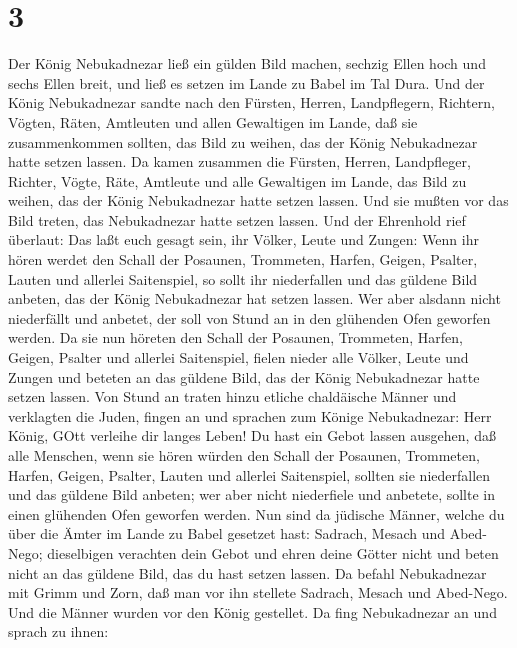 \hypertarget{section-2}{%
\section{3}\label{section-2}}

 Der König Nebukadnezar ließ ein gülden Bild machen, sechzig
Ellen hoch und sechs Ellen breit, und ließ es setzen im Lande zu Babel
im Tal Dura.  Und der König Nebukadnezar sandte nach den
Fürsten, Herren, Landpflegern, Richtern, Vögten, Räten, Amtleuten und
allen Gewaltigen im Lande, daß sie zusammenkommen sollten, das Bild zu
weihen, das der König Nebukadnezar hatte setzen lassen.  Da
kamen zusammen die Fürsten, Herren, Landpfleger, Richter, Vögte, Räte,
Amtleute und alle Gewaltigen im Lande, das Bild zu weihen, das der König
Nebukadnezar hatte setzen lassen. Und sie mußten vor das Bild treten,
das Nebukadnezar hatte setzen lassen.  Und der Ehrenhold
rief überlaut: Das laßt euch gesagt sein, ihr Völker, Leute und Zungen:
 Wenn ihr hören werdet den Schall der Posaunen, Trommeten,
Harfen, Geigen, Psalter, Lauten und allerlei Saitenspiel, so sollt ihr
niederfallen und das güldene Bild anbeten, das der König Nebukadnezar
hat setzen lassen.  Wer aber alsdann nicht niederfällt und
anbetet, der soll von Stund an in den glühenden Ofen geworfen werden.
 Da sie nun höreten den Schall der Posaunen, Trommeten,
Harfen, Geigen, Psalter und allerlei Saitenspiel, fielen nieder alle
Völker, Leute und Zungen und beteten an das güldene Bild, das der König
Nebukadnezar hatte setzen lassen.  Von Stund an traten hinzu
etliche chaldäische Männer und verklagten die Juden,  fingen
an und sprachen zum Könige Nebukadnezar: Herr König, GOtt verleihe dir
langes Leben!  Du hast ein Gebot lassen ausgehen, daß alle
Menschen, wenn sie hören würden den Schall der Posaunen, Trommeten,
Harfen, Geigen, Psalter, Lauten und allerlei Saitenspiel, sollten sie
niederfallen und das güldene Bild anbeten;  wer aber nicht
niederfiele und anbetete, sollte in einen glühenden Ofen geworfen
werden.  Nun sind da jüdische Männer, welche du über die
Ämter im Lande zu Babel gesetzet hast: Sadrach, Mesach und Abed-Nego;
dieselbigen verachten dein Gebot und ehren deine Götter nicht und beten
nicht an das güldene Bild, das du hast setzen lassen.  Da
befahl Nebukadnezar mit Grimm und Zorn, daß man vor ihn stellete
Sadrach, Mesach und Abed-Nego. Und die Männer wurden vor den König
gestellet.  Da fing Nebukadnezar an und sprach zu ihnen:
